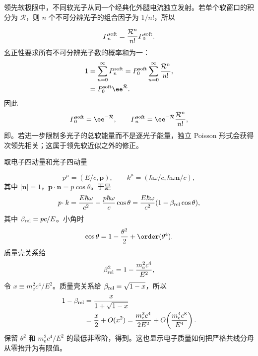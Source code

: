 \begin{derivation}
领先软极限中，不同软光子从同一个经典化外腿电流独立发射。若单个软窗口的积分为 $\mathcal R$，则 $n$ 个不可分辨光子的组合因子为 $1/n!$，所以

\begin{equation*}
 P_n^{\rm soft}=\frac{\mathcal R^n}{n!}P_0^{\rm soft}.
\end{equation*}
幺正性要求所有不可分辨光子数的概率和为一：
\begin{align*}
 1
 &=\sum_{n=0}^{\infty}P_n^{\rm soft}
 =P_0^{\rm soft}\sum_{n=0}^{\infty}\frac{\mathcal R^n}{n!},\\
 &=P_0^{\rm soft}\ee^{\mathcal R}.
\end{align*}
因此
\begin{equation*}
 P_0^{\rm soft}=\ee^{-\mathcal R},
 \qquad
 P_n^{\rm soft}=\ee^{-\mathcal R}\frac{\mathcal R^n}{n!},
\end{equation*}
即。若进一步限制多光子的总软能量而不是逐光子能量，独立 Poisson 形式会获得次领先相关；这属于领先软近似之外的修正。
\end{derivation}

\begin{derivation}
取电子四动量和光子四动量

\begin{equation*}
 p^\mu=(E/c,\mathbf p),
 \qquad
 k^\mu=(\hbar\omega/c,\hbar\omega\mathbf n/c),
\end{equation*}
其中 $|\mathbf n|=1$，$\mathbf p\cdot\mathbf n=p\cos\theta$。于是
\begin{equation*}
 p\!\cdot k
 =\frac{E\hbar\omega}{c^2}
 -\frac{p\hbar\omega}{c}\cos\theta
 =\frac{E\hbar\omega}{c^2}(1-\beta_{\rm rel}\cos\theta),
\end{equation*}
其中 $\beta_{\rm rel}=pc/E$。小角时
\begin{equation*}
 \cos\theta=1-\frac{\theta^2}{2}+\order(\theta^4).
\end{equation*}
质量壳关系给
\begin{equation*}
 \beta_{\rm rel}^2=1-\frac{m_{\mathrm e}^2c^4}{E^2},
\end{equation*}
令 $x\equiv m_{\mathrm e}^2c^4/E^2$。质量壳关系给 $\beta_{\rm rel}=\sqrt{1-x}$，所以
\begin{align*}
1-\beta_{\rm rel}
&=\frac{x}{1+\sqrt{1-x}}\\
&=\frac{x}{2}+O(x^2)
=\frac{m_{\mathrm e}^2c^4}{2E^2}
+O\!\left(\frac{m_{\mathrm e}^4c^8}{E^4}\right).
\end{align*}
保留 $\theta^2$ 和 $m_{\mathrm e}^2c^4/E^2$ 的最低非零阶，得到。这也显示电子质量如何把严格共线分母从零抬升为有限值。
\end{derivation}
